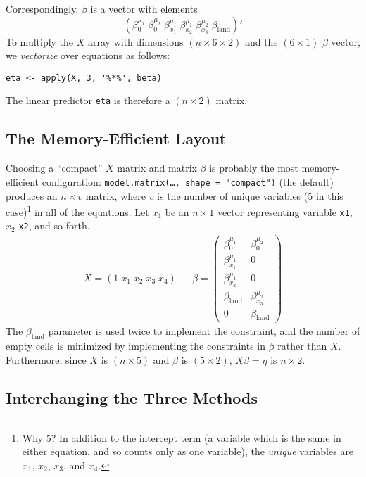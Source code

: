 Correspondingly, $\beta$ is a vector with elements
\begin{equation*}
(\beta_0^{\mu_1} \; \beta_0^{\mu_2} \; \beta_{x_1}^{\mu_1} \;
\beta_{x_2}^{\mu_1} \; \beta_{x_3}^{\mu_2} \; \beta_{\textrm{land}})\prime
\end{equation*}
To multiply the $X$ array with dimensions $(n \times 6 \times 2)$ and
the $(6 \times 1)$ $\beta$ vector, we \emph{vectorize} over equations
as follows:  
\begin{verbatim}
eta <- apply(X, 3, '%*%', beta) 
\end{verbatim}
The linear predictor {\tt eta} is therefore a $(n \times 2)$ matrix.  

\subsection{The Memory-Efficient Layout}  

Choosing a ``compact'' $X$ matrix and matrix $\beta$ is probably the most
memory-efficient configuration: {\tt model.matrix(\dots,
shape = "compact")} (the default) produces an $n \times v$ matrix,
where $v$ is the number of unique variables (5 in this
case)\footnote{Why 5? In addition to the intercept term (a variable
which is the same in either equation, and so counts only as one
variable), the \emph{unique} variables are $x_1$, $x_2$, $x_3$, and
$x_4$.} in all of the equations.  Let $x_1$ be an $n \times 1$ vector
representing variable {\tt x1}, $x_2$ {\tt x2}, and so forth.
\begin{eqnarray*}
X = (1 \; x_1 \; x_2 \; x_3 \; x_4) & & \beta = \left( \begin{array}{cc}

	   \beta_0^{\mu_1}       & \beta_0^{\mu_2} \\
\beta_{x_1}^{\mu_1}       & 0 \\
\beta_{x_2}^{\mu_1}       & 0 \\
\beta_{\textrm{land}} & \beta_{x_3}^{\mu_2} \\
0                     & \beta_{\textrm{land}}
\end{array} \right) 
\end{eqnarray*}
The $\beta_{\textrm{land}}$ parameter is used twice to implement the
constraint, and the number of empty cells is minimized by implementing
the constraints in $\beta$ rather than $X$.  Furthermore, since $X$ is
$(n \times 5)$ and $\beta$ is $(5 \times 2)$, $X\beta = \eta$ is $n
\times 2$.

\subsection{Interchanging the Three Methods}  
\label{bivariate.probit.llik} 

